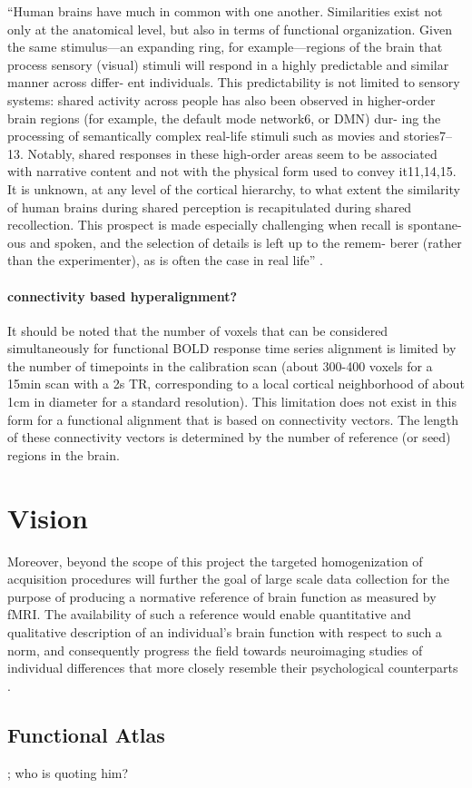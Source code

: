 ``Human brains have much in common with one another. Similarities exist not only
at the anatomical level, but also in terms of functional organization. Given the
same stimulus—an expanding ring, for example—regions of the brain that process
sensory (visual) stimuli will respond in a highly predictable and similar manner
across differ- ent individuals. This predictability is not limited to sensory
systems: shared activity across people has also been observed in higher-order
brain regions (for example, the default mode network6, or DMN) dur- ing the
processing of semantically complex real-life stimuli such as movies and
stories7–13. Notably, shared responses in these high-order areas seem to be
associated with narrative content and not with the physical form used to convey
it11,14,15. It is unknown, at any level of the cortical hierarchy, to what
extent the similarity of human brains during shared perception is recapitulated
during shared recollection. This prospect is made especially challenging when
recall is spontane- ous and spoken, and the selection of details is left up to
the remem- berer (rather than the experimenter), as is often the case in real
life'' \citep{chen2017shared}.


\paragraph{connectivity based hyperalignment?}
%
It should be noted that the number of voxels that can be considered
simultaneously for functional BOLD response time series alignment is limited by
the number of timepoints in the calibration scan (about 300-400 voxels for a
15min scan with a 2s TR, corresponding to a local cortical neighborhood of about
1cm in diameter for a standard resolution).
%
This limitation does not exist in this form for a functional alignment that is
based on connectivity vectors.
%
The length of these connectivity vectors is determined by the number of
reference (or seed) regions in the brain.


\section{Vision}
%
Moreover, beyond the scope of this project the targeted homogenization of
acquisition procedures will further the goal of large scale data collection for
the purpose of producing a normative reference of brain function as measured by
fMRI.
%
The availability of such a reference would enable quantitative and qualitative
description of an individual's brain function with respect to such a norm, and
consequently progress the field towards neuroimaging studies of individual
differences that more closely resemble their psychological counterparts
\citep{dubois2016building}.

\subsection{Functional Atlas}

\citep{bazeille2019local}; who is quoting him?
